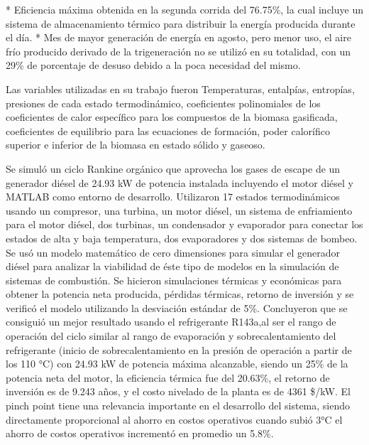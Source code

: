 
\begin{markdown}
* Eficiencia máxima obtenida en la segunda corrida del 76.75\%, la cual incluye un sistema de almacenamiento térmico para distribuir la energía producida durante el día.
* Mes de mayor generación de energía en agosto, pero menor  uso, el aire frío producido derivado de la trigeneración no se utilizó en su totalidad, con un 29\% de porcentaje de desuso debido a la poca necesidad del mismo.
\end{markdown}

Las variables utilizadas en su trabajo fueron Temperaturas, entalpías, entropías, presiones de cada estado termodinámico, coeficientes polinomiales de los coeficientes de calor específico para los compuestos de la biomasa gasificada, coeficientes de equilibrio para las ecuaciones de formación, poder calorífico superior e inferior de la biomasa en estado sólido y gaseoso.

\textcite{MOHAMMADKHANI2019329} Se simuló un ciclo Rankine orgánico que aprovecha los gases de escape de un generador diésel de 24.93 kW de potencia instalada incluyendo el motor diésel y MATLAB como entorno de desarrollo. Utilizaron 17 estados termodinámicos usando un compresor, una turbina, un motor diésel, un sistema de enfriamiento para el motor diésel, dos turbinas, un condensador y evaporador para conectar los estados de alta y baja temperatura, dos evaporadores y dos sistemas de bombeo. Se usó un modelo matemático de cero dimensiones para simular el generador diésel para analizar la viabilidad de éste tipo de modelos en la simulación de sistemas de combustión. Se hicieron simulaciones térmicas y económicas para obtener la potencia neta producida, pérdidas térmicas, retorno de inversión y se verificó el modelo utilizando la desviación estándar de 5\%. Concluyeron que se consiguió un mejor resultado usando el refrigerante R143a,al ser el rango de operación del ciclo similar al rango de evaporación y sobrecalentamiento del refrigerante (inicio de sobrecalentamiento en la presión de operación a partir de los 110 °C) con 24.93 kW de potencia máxima alcanzable, siendo un 25\% de la potencia neta del motor, la eficiencia térmica fue del 20.63\%, el retorno de inversión es de 9.243 años, y el costo nivelado de la planta es de 4361 \$/kW. El pinch point tiene una relevancia importante en el desarrollo del sistema, siendo directamente proporcional al ahorro en costos operativos cuando subió 3°C el ahorro de costos operativos incrementó en promedio un 5.8\%.

